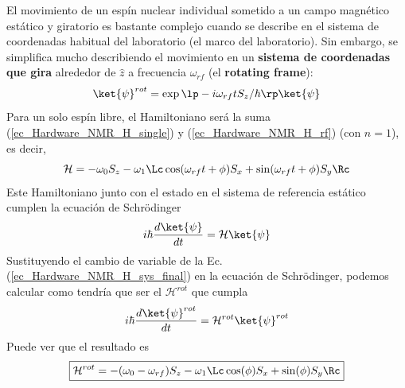 El movimiento de un espín nuclear individual sometido a un campo magnético estático y giratorio es bastante complejo cuando se describe en el sistema de coordenadas habitual del laboratorio (el marco del laboratorio). Sin embargo, se simplifica mucho describiendo el movimiento en un \textbf{sistema de coordenadas que gira} alrededor de $\hat{z}$ a frecuencia $\omega_{rf}$ (el \textbf{rotating frame}):
	\begin{equation} \label{ec_Hardware_NMR_psi_rot}
	\ket{\psi}^{rot} = \exp \lp -i \omega_{rf} t S_z/\hbar \rp \ket{\psi}
	\end{equation}
Para un solo espín libre, el Hamiltoniano será la suma (\ref{ec_Hardware_NMR_H_single}) y (\ref{ec_Hardware_NMR_H_rf}) (con $n=1$), es decir,
	\begin{equation} \label{ec_Hardware_NMR_H_lab_single}
	\mathcal{H} = - \omega_0 S_z - \omega_1 \Lc \cos (\omega_{rf} t+ \phi) S_x + \sin (\omega_{rf} t + \phi) S_y \Rc
	\end{equation}
Este Hamiltoniano junto con el estado en el sistema de referencia estático cumplen la ecuación de Schrödinger
	\begin{equation}
	i \hbar \frac{d \ket{\psi}}{dt} = \mathcal{H} \ket{\psi}
	\end{equation}
Sustituyendo el cambio de variable de la Ec. (\ref{ec_Hardware_NMR_H_sys_final}) en la ecuación de Schrödinger, podemos calcular como tendría que ser el $\mathcal{H}^{rot}$ que cumpla
	\begin{equation}
	i \hbar \frac{d \ket{\psi}^{rot}}{dt} = \mathcal{H}^{rot} \ket{\psi}^{rot}
	\end{equation}
Puede ver que el resultado es
	\begin{equation} \label{ec_Hardware_NMR_H_rot_single}
	\boxed{\mathcal{H}^{rot} = - (\omega_0 - \omega_{rf}) S_z - \omega_1 \Lc \cos (\phi) S_x + \sin  (\phi) S_y \Rc}
	\end{equation}


